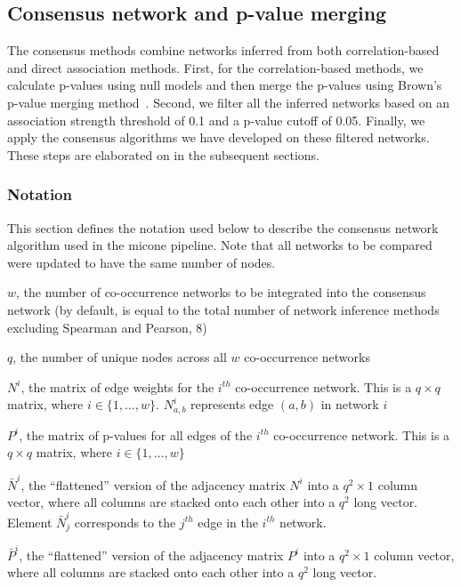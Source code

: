 \documentclass[letterpaper,12pt]{article}
\begin{document}
  \subsection*{Consensus network and p-value merging}
  The consensus methods combine networks inferred from both correlation-based and direct association methods.
  First, for the correlation-based methods, we calculate p-values using null models and then merge the p-values using Brown's p-value merging method~\cite{Poole_Gibbs_Shmulevich_Bernard_Knijnenburg_2016,faustCoNetAppInference2016}.
  Second, we filter all the inferred networks based on an association strength threshold of 0.1 and a p-value cutoff of 0.05.
  Finally, we apply the consensus algorithms we have developed on these filtered networks.
  These steps are elaborated on in the subsequent sections.

 \subsubsection*{Notation}
  \vspace{-5mm}
 This section defines the notation used below to describe the consensus network algorithm used in the \ac{micone} pipeline.
 Note that all networks to be compared were updated to have the same number of nodes.

  $w$, the number of co-occurrence networks to be integrated into the consensus network (by default, is equal to the total number of network inference methods excluding Spearman and Pearson, 8)

  $q$, the number of unique nodes across all $w$ co-occurrence networks

  $N^i$, the matrix of edge weights for the $i^{th}$ co-occurrence network.
  This is a $q \times q$ matrix, where $i \in \{1,\dots,w\}$.
  $N^i_{a,b}$ represents edge $(a,b)$ in network $i$

  $P^i$, the matrix of p-values for all edges of the $i^{th}$ co-occurrence network.
  This is a $q \times q$ matrix, where $i \in \{1,\dots,w\}$

  $\bar{N}^i$, the ``flattened'' version of the adjacency matrix $N^i$ into a $q^2 \times 1$ column vector, where all columns are stacked onto each other into a $q^2$ long vector.
  Element $\bar{N}^i_j$ corresponds to the $j^{th}$ edge in the $i^{th}$ network.

  $\bar{P}^i$, the ``flattened'' version of the adjacency matrix $P^i$ into a $q^2 \times 1$ column vector, where all columns are stacked onto each other into a $q^2$ long vector.
\end{document}
